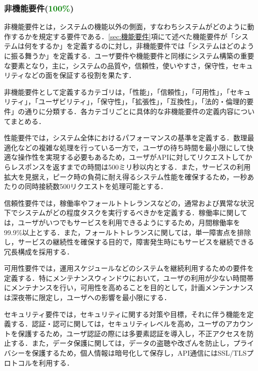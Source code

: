       \subsubsection{非機能要件(\textcolor{green}{100\%})}
        \label{sec:非機能要件}
          \par 非機能要件とは，システムの機能以外の側面，すなわちシステムがどのように動作するかを規定する要件である．\ref{sec:機能要件}項にて述べた機能要件が「システムは何をするか」を定義するのに対し，非機能要件では「システムはどのように振る舞うか」を定義する．ユーザ要件や機能要件と同様にシステム構築の重要な要素となり，主に，システムの品質や，信頼性，使いやすさ，保守性，セキュリティなどの面を保証する役割を果たす．
          \par 非機能要件として定義するカテゴリは，「性能」，「信頼性」，「可用性」，「セキュリティ」，「ユーザビリティ」，「保守性」，「拡張性」，「互換性」，「法的・倫理的要件」の通りに分類する．各カテゴリごとに具体的な非機能要件の定義内容についてまとめる．
          \par 性能要件では，システム全体におけるパフォーマンスの基準を定義する．数理最適化などの複雑な処理を行っている一方で，ユーザの待ち時間を最小限にして快適な操作性を実現する必要もあるため，ユーザがAPIに対してリクエストしてからレスポンスを返すまでの時間は500ミリ秒以内とする．また，サービスの利用拡大を見据え，ピーク時の負荷に耐え得るシステム性能を確保するため，一秒あたりの同時接続数500リクエストを処理可能とする．
          \par 信頼性要件では，稼働率やフォールトトレランスなどの，通常および異常な状況下でシステムがどの程度タスクを実行するべきかを定義する．稼働率に関しては，ユーザがいつでもサービスを利用できるようにするため，月間稼働率を99.9\%以上とする．また，フォールトトレランスに関しては，単一障害点を排除し，サービスの継続性を確保する目的で，障害発生時にもサービスを継続できる冗長構成を採用する．
          \par 可用性要件では，運用スケジュールなどのシステムを継続利用するための要件を定義する．特にメンテナンスウィンドウにおいて，ユーザの利用が少ない時間帯にメンテナンスを行い，可用性を高めることを目的として，計画メンテンナンスは深夜帯に限定し，ユーザへの影響を最小限にする．
          \par セキュリティ要件では，セキュリティに関する対策や目標，それに伴う機能を定義する．認証・認可に関しては，セキュリティレベルを高め，ユーザのアカウントを保護するため，ユーザ認証の際には多要素認証を導入し，不正アクセスを防止する．また，データ保護に関しては，データの盗聴や改ざんを防止し，プライバシーを保護するため，個人情報は暗号化して保存し，API通信にはSSL/TLSプロトコルを利用する．
